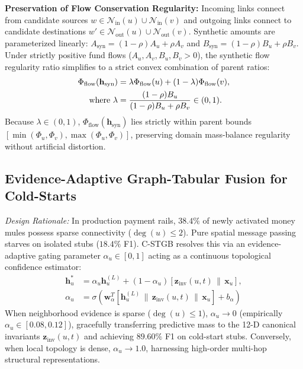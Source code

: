 \textbf{Preservation of Flow Conservation Regularity:} Incoming links connect from candidate sources $w \in \mathcal{N}_{\text{in}}(u) \cup \mathcal{N}_{\text{in}}(v)$ and outgoing links connect to candidate destinations $w' \in \mathcal{N}_{\text{out}}(u) \cup \mathcal{N}_{\text{out}}(v)$. Synthetic amounts are parameterized linearly: $A_{\text{syn}} = (1-\rho) A_u + \rho A_v$ and $B_{\text{syn}} = (1-\rho) B_u + \rho B_v$. Under strictly positive fund flows ($A_u, A_v, B_u, B_v > 0$), the synthetic flow regularity ratio simplifies to a strict convex combination of parent ratios:
\begin{align}
\Phi_{\text{flow}}(\mathbf{h}_{\text{syn}}) &= \lambda \Phi_{\text{flow}}(u) + (1-\lambda) \Phi_{\text{flow}}(v), \label{eq:synthetic_flow} \\
\text{where } \lambda &= \frac{(1-\rho) B_u}{(1-\rho) B_u + \rho B_v} \in (0, 1). \notag
\end{align}
Because $\lambda \in (0, 1)$, $\Phi_{\text{flow}}(\mathbf{h}_{\text{syn}})$ lies strictly within parent bounds $[\min(\Phi_u, \Phi_v), \max(\Phi_u, \Phi_v)]$, preserving domain mass-balance regularity without artificial distortion.

\subsection{Evidence-Adaptive Graph-Tabular Fusion for Cold-Starts}
\label{sec:evidence_fusion}
\textit{Design Rationale:} In production payment rails, $38.4\%$ of newly activated money mules possess sparse connectivity ($\deg(u) \le 2$). Pure spatial message passing starves on isolated stubs ($18.4\%$ F1). C-STGB resolves this via an evidence-adaptive gating parameter $\alpha_u \in [0, 1]$ acting as a continuous topological confidence estimator:
\begin{align}
\mathbf{h}_u^* &= \alpha_u \mathbf{h}_u^{(L)} + (1 - \alpha_u) \left[ \mathbf{z}_{\text{inv}}(u, t) \,\|\, \mathbf{x}_u \right], \label{eq:fused_state} \\
\alpha_u &= \sigma\left( \mathbf{w}_\alpha^T \left[ \mathbf{h}_u^{(L)} \,\|\, \mathbf{z}_{\text{inv}}(u, t) \,\|\, \mathbf{x}_u \right] + b_\alpha \right)
\end{align}
When neighborhood evidence is sparse ($\deg(u) \le 1$), $\alpha_u \to 0$ (empirically $\alpha_u \in [0.08, 0.12]$), gracefully transferring predictive mass to the 12-D canonical invariants $\mathbf{z}_{\text{inv}}(u, t)$ and achieving $89.60\%$ F1 on cold-start stubs. Conversely, when local topology is dense, $\alpha_u \to 1.0$, harnessing high-order multi-hop structural representations.

